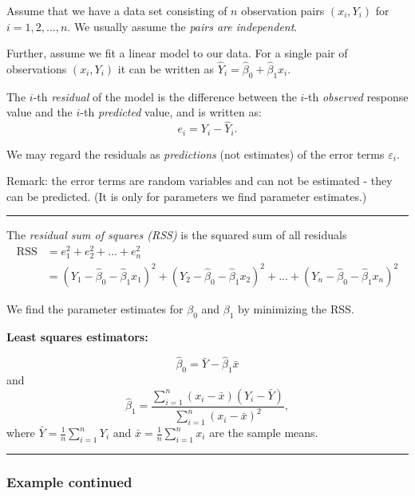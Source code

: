 \documentclass[]{article}
\begin{document}
Assume that we have a data set consisting of \(n\) observation pairs
\((x_i, Y_i)\) for \(i = 1,2,..., n\). We usually assume the \emph{pairs
are independent}.

Further, assume we fit a linear model to our data. For a single pair of
observations \((x_i, Y_i)\) it can be written as
\(\hat{Y}_i = \hat{\beta}_0 + \hat{\beta}_1 x_i\).

The \(i\)-th \emph{residual} of the model is the difference between the
\(i\)-th \emph{observed} response value and the \(i\)-th
\emph{predicted} value, and is written as: \[e_i = Y_i - \hat{Y}_i.\]

We may regard the residuals as \emph{predictions} (not estimates) of the
error terms \(\varepsilon_i\).

Remark: the error terms are random variables and can not be estimated -
they can be predicted. (It is only for parameters we find parameter
estimates.)

\begin{center}\rule{0.5\linewidth}{\linethickness}\end{center}

The \emph{residual sum of squares (RSS)} is the squared sum of all
residuals
\[\begin{aligned} \text{RSS} &= e_1^2+e_2^2+...+e_n^2 \\ &= (Y_1 - \hat{\beta}_0 - \hat{\beta}_1 x_1)^2  + (Y_2 -\hat{\beta}_0 - \hat{\beta}_1 x_2)^2+ ... + (Y_n -\hat{\beta}_0 - \hat{\beta}_1 x_n)^2  \end{aligned}\]

We find the parameter estimates for \(\beta_0\) and \(\beta_1\) by
minimizing the RSS.

\textbf{Least squares estimators:}

\[\hat{\beta}_0 = \bar{Y}-\hat{\beta}_1 \bar{x}\] and
\[\hat{\beta}_1 = \frac{\sum_{i=1}^n(x_i-\bar{x})(Y_i-\bar{Y})}{\sum_{i=1}^n(x_i-\bar{x})^2},\]
where \(\bar{Y} = \frac{1}{n} \sum_{i=1}^n Y_i\) and
\(\bar{x} = \frac{1}{n}\sum_{i=1}^n x_i\) are the sample means.

\begin{center}\rule{0.5\linewidth}{\linethickness}\end{center}

\hypertarget{example-continued}{%
\subsubsection{Example continued}\label{example-continued}}
\end{document}
